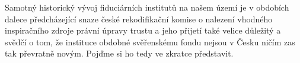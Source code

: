 \documentclass{article}
\begin{document}
Samotný historický vývoj fiduciárních institutů na našem území je v obdobích dalece předcházející snaze české rekodifikační komise o nalezení vhodného inspiračního zdroje právní úpravy trustu a jeho přijetí také velice důležitý a svědčí o tom, že instituce obdobné svěřenskému fondu nejsou v Česku ničím zas tak převratně novým. Pojďme si ho tedy ve zkratce představit.

 
 
 



\end{document}
